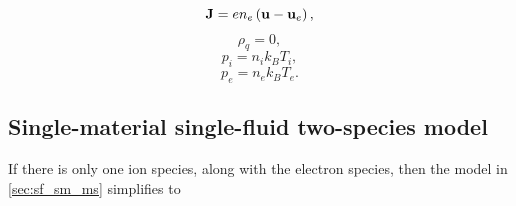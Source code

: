 \documentclass[a4paper,11pt]{report}
\begin{document}
\begin{equation}
    \label{eq:sf_sm_ms_curr_density}
    \mathbf{J} = e n_e \left( \mathbf{u} - \mathbf{u}_e \right),
\end{equation}
\begin{equation}
    \label{eq:sf_sm_ms_mass_density}
    \rho_q = 0,
\end{equation}
\begin{equation}
    \label{eq:sf_sm_ms_eos_ion}
    p_i = n_i k_B T_i,
\end{equation}
\begin{equation}
    \label{eq:sf_sm_ms_eos_elec}
    p_e = n_e k_B T_e.
\end{equation}

\subsection{Single-material single-fluid two-species model}
If there is only one ion species, along with the electron species, then the model in \cref{sec:sf_sm_ms} simplifies to
\end{document}
